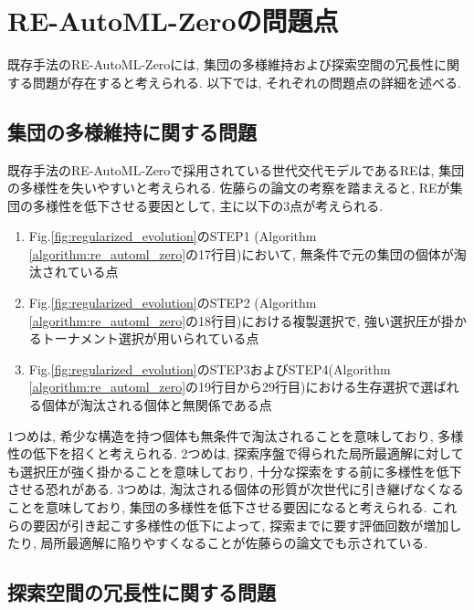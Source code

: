 \documentclass[11pt,oneside,openany,report]{jsbook}
\begin{document}
\section{RE-AutoML-Zeroの問題点}\label{sec:mgg_automl_zero_av:existing_problem}

既存手法のRE-AutoML-Zeroには, 集団の多様維持および探索空間の冗長性に関する問題が存在すると考えられる. 以下では, それぞれの問題点の詳細を述べる.

\subsection{集団の多様維持に関する問題}\label{subsec:mgg_automl_zero_av:existing_problem:diversity}

既存手法のRE-AutoML-Zeroで採用されている世代交代モデルであるREは, 集団の多様性を失いやすいと考えられる. 佐藤らの論文\cite{mgg}の考察を踏まえると, REが集団の多様性を低下させる要因として, 主に以下の3点が考えられる.

\begin{enumerate}
  \item Fig.\ref{fig:regularized_evolution}のSTEP1 (Algorithm \ref{algorithm:re_automl_zero}の17行目)において, 無条件で元の集団の個体が淘汰されている点
  \item Fig.\ref{fig:regularized_evolution}のSTEP2 (Algorithm \ref{algorithm:re_automl_zero}の18行目)における複製選択で, 強い選択圧が掛かるトーナメント選択が用いられている点
  \item Fig.\ref{fig:regularized_evolution}のSTEP3およびSTEP4(Algorithm \ref{algorithm:re_automl_zero}の19行目から29行目)における生存選択で選ばれる個体が淘汰される個体と無関係である点
\end{enumerate}

\noindent
1つめは, 希少な構造を持つ個体も無条件で淘汰されることを意味しており, 多様性の低下を招くと考えられる. 2つめは, 探索序盤で得られた局所最適解に対しても選択圧が強く掛かることを意味しており, 十分な探索をする前に多様性を低下させる恐れがある. 3つめは, 淘汰される個体の形質が次世代に引き継げなくなることを意味しており, 集団の多様性を低下させる要因になると考えられる. これらの要因が引き起こす多様性の低下によって, 探索までに要す評価回数が増加したり, 局所最適解に陥りやすくなることが佐藤らの論文\cite{mgg}でも示されている.

\subsection{探索空間の冗長性に関する問題}\label{subsec:mgg_automl_zero_av:existing_problem:space}
\end{document}

